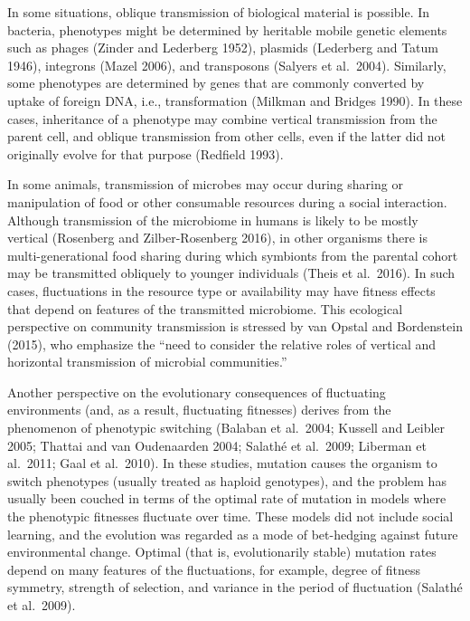 In some situations, oblique transmission of biological material is possible. In bacteria, phenotypes might be determined by heritable mobile genetic elements such as phages (Zinder and Lederberg 1952), plasmids (Lederberg and Tatum 1946), integrons (Mazel 2006), and transposons (Salyers et al.\ 2004). Similarly, some phenotypes are determined by genes that are commonly converted by uptake of foreign DNA, i.e., transformation (Milkman and Bridges 1990). In these cases, inheritance of a phenotype may combine vertical transmission from the parent cell, and oblique transmission from other cells, even if the latter did not originally evolve for that purpose (Redfield 1993). 

In some animals, transmission of microbes may occur during sharing or manipulation of food or other consumable resources during a social interaction. Although transmission of the microbiome in humans is likely to be mostly vertical (Rosenberg and Zilber-Rosenberg 2016), in other organisms there is multi-generational food sharing during which symbionts from the parental cohort may be transmitted obliquely to younger individuals (Theis et al.\ 2016). In such cases, fluctuations in the resource type or availability may have fitness effects that depend on features of the transmitted microbiome. This ecological perspective on community transmission is stressed by van Opstal and Bordenstein (2015), who emphasize the ``need to consider the relative roles of vertical and horizontal transmission of microbial communities.''

Another perspective on the evolutionary consequences of fluctuating environments (and, as a result, fluctuating fitnesses) derives from the phenomenon of phenotypic switching (Balaban et al.\ 2004; Kussell and Leibler 2005; Thattai and van Oudenaarden 2004; Salath\'e et al.\ 2009; Liberman et al.\ 2011; Gaal et al.\ 2010). In these studies, mutation causes the organism to switch phenotypes (usually treated as haploid genotypes), and the problem has usually been couched in terms of the optimal rate of mutation in models where the phenotypic fitnesses fluctuate over time. These models did not include social learning, and the evolution was regarded as a mode of bet-hedging against future environmental change. Optimal (that is, evolutionarily stable) mutation rates depend on many features of the fluctuations, for example,  degree of fitness symmetry, strength of selection, and variance in the period of fluctuation (Salath\'e et al.\ 2009).

